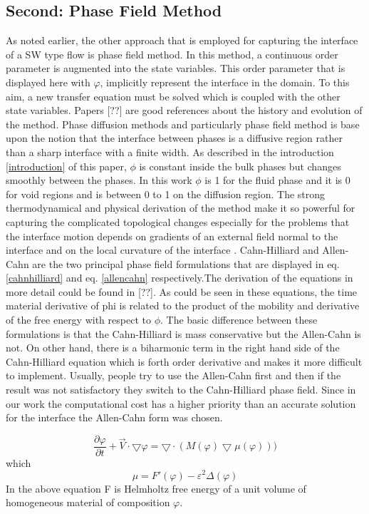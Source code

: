 \documentclass[letterpaper,10pt]{article}
\begin{document}
\subsection{Second: Phase Field Method} \label{phase field}
As noted earlier, the other approach that is employed 
for capturing the interface of a SW type flow is phase field method.
In this method, a continuous
order parameter is augmented into the state variables. This order parameter that is displayed here with $\varphi$, 
implicitly represent the interface in the domain. To this aim, a new transfer equation 
must be solved which is coupled with the other state variables. Papers [??] are good references about the history and evolution of the method.
Phase diffusion methods and particularly phase field method is base upon the notion that the interface between phases is a diffusive region rather than a sharp interface with a finite width. 
As described in the introduction \ref{introduction} of this paper, $\phi$ is constant inside the bulk phases but changes smoothly between the phases. In this work $\phi$ is 1 for the fluid phase and it is 0 for void regions and is between 0 to 1 on the diffusion region.
The strong thermodynamical and physical derivation of the method make it so powerful for capturing the complicated topological changes especially for the problems that the interface motion depends on gradients of an external field normal to the interface and on the local curvature of the interface \cite{Beckermann2006}.
Cahn-Hilliard and Allen-Cahn are the two principal phase field formulations that 
are displayed in eq. \eqref{cahnhilliard} and eq. \eqref{allencahn} respectively.The derivation of the equations in more detail could be 
found in [??]. As could be seen in these equations, the time material derivative of phi is related to the product of the 
mobility and derivative of the free energy with respect to $\phi$. The basic difference between these formulations is that the 
Cahn-Hilliard is mass conservative but the Allen-Cahn is not. On other hand, there is a biharmonic term in the right hand side of 
the Cahn-Hilliard equation which is forth order derivative and makes it more difficult to implement. Usually, people try to 
use the Allen-Cahn first and then if the result was not satisfactory they switch to the Cahn-Hilliard phase field. 
Since in our work the computational cost has a higher priority than an accurate solution for the interface the Allen-Cahn 
form was chosen.

\begin{equation}
 \label{cahnhilliard}
\frac{\partial \varphi }{\partial t} + \overrightarrow{V} \cdot \bigtriangledown \varphi = 
\bigtriangledown \cdot (M(\varphi) \bigtriangledown\mu(\varphi)))
\end{equation}
which \newline
\begin{equation}
\mu = F'(\varphi)- \varepsilon^2 \Delta (\varphi)
\end{equation}
In the above equation F is Helmholtz free energy of a unit volume of homogeneous material of composition $\varphi$. 
\end{document}
